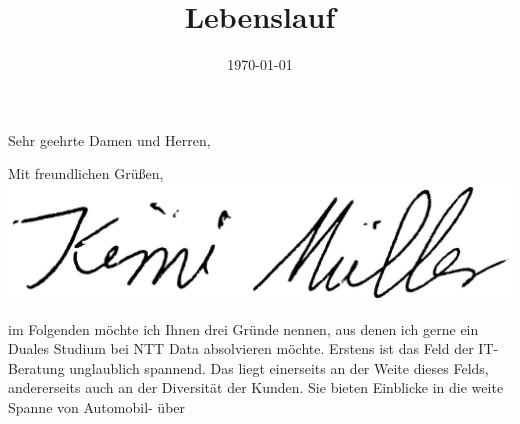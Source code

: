 \documentclass[11pt,a4paper,sans]{moderncv}        %
\title{Lebenslauf}                               %
\begin{document}
\date{\today}
\subject{Bewerbung um ein Duales Studium der Informatik}
\opening{Sehr geehrte Damen und Herren,}
\closing{Mit freundlichen Grüßen,\\ \includegraphics[scale=0.4]{images/Unterschrift2.png}}
\makelettertitle
im Folgenden möchte ich Ihnen drei Gründe nennen, aus denen ich gerne ein Duales Studium bei NTT Data absolvieren möchte.\newline \newline
Erstens ist das Feld der IT-Beratung unglaublich spannend. Das liegt einerseits an der Weite dieses Felds, andererseits auch an der Diversität der Kunden. Sie bieten Einblicke in die weite Spanne von Automobil- über
\end{document}

